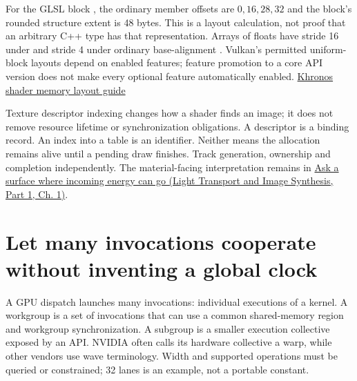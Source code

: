 For the GLSL block , the ordinary member offsets are \(0,16,28,32\) and the block's rounded structure extent is 48 bytes. This is a layout calculation, not proof that an arbitrary C++ type has that representation. Arrays of floats have stride 16 under  and stride 4 under ordinary base-alignment . Vulkan's permitted uniform-block layouts depend on enabled features; feature promotion to a core API version does not make every optional feature automatically enabled. \href{https://docs.vulkan.org/guide/latest/shader_memory_layout.html}{Khronos shader memory layout guide}

Texture descriptor indexing changes how a shader finds an image; it does not remove resource lifetime or synchronization obligations. A descriptor is a binding record. An index into a table is an identifier. Neither means the allocation remains alive until a pending draw finishes. Track generation, ownership and completion independently. The material-facing interpretation remains in \href{../04-Light-Transport-and-Image-Synthesis-P01/main.pdf\#nameddest=03-visual-computing-i-ch005-ask-a-surface-where-incoming-energy-can-go}{Ask a surface where incoming energy can go (Light Transport and Image Synthesis, Part 1, Ch. 1)}.

\section{Let many invocations cooperate without inventing a global clock}\label{01-foundations-i-ch008-let-many-invocations-cooperate-without-inventing-a-global-clock}

\hypertarget{01-foundations-i-ch008-let-many-invocations-cooperate-without-inventing-a-global-clock}{}

A GPU dispatch launches many invocations: individual executions of a kernel. A workgroup is a set of invocations that can use a common shared-memory region and workgroup synchronization. A subgroup is a smaller execution collective exposed by an API. NVIDIA often calls its hardware collective a warp, while other vendors use wave terminology. Width and supported operations must be queried or constrained; 32 lanes is an example, not a portable constant.

